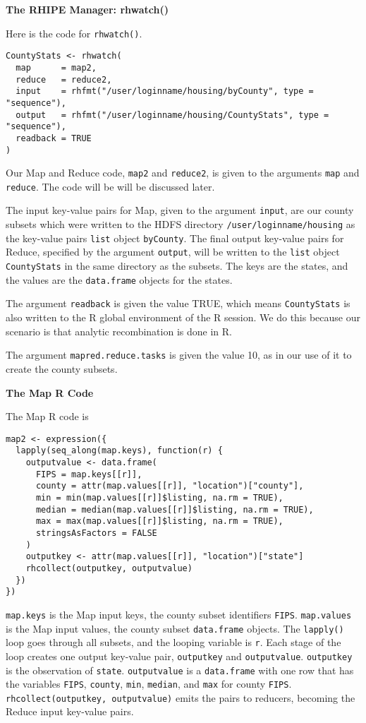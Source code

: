 \textbf{The RHIPE Manager: rhwatch()}

Here is the code for \texttt{rhwatch()}.

\begin{verbatim}
CountyStats <- rhwatch(
  map      = map2,
  reduce   = reduce2,
  input    = rhfmt("/user/loginname/housing/byCounty", type = "sequence"),
  output   = rhfmt("/user/loginname/housing/CountyStats", type = "sequence"),
  readback = TRUE
)
\end{verbatim}

Our Map and Reduce code, \texttt{map2} and \texttt{reduce2}, is given to the arguments
\texttt{map} and \texttt{reduce}. The code will be will be discussed later.

The input key-value pairs for Map, given to the argument \texttt{input},
are our county subsets which were written to the HDFS directory
\texttt{/user/loginname/housing}  as the key-value pairs \texttt{list} object \texttt{byCounty}. 
The final output key-value pairs for Reduce, specified by the argument
\texttt{output}, will be written to the \texttt{list} object \texttt{CountyStats} in the same
directory as the subsets. The keys are the states, and the values are the
\texttt{data.frame} objects for the states.

The argument \texttt{readback} is given the value TRUE, which means \texttt{CountyStats} is
also written to the R global environment of the R session. We do this because
our scenario is that analytic recombination is done in R.

The argument \texttt{mapred.reduce.tasks} is given the value 10, as in our use of it
to create the county subsets.


\textbf{The Map R Code}

The Map R code is
\begin{verbatim}
map2 <- expression({
  lapply(seq_along(map.keys), function(r) {
    outputvalue <- data.frame(
      FIPS = map.keys[[r]],
      county = attr(map.values[[r]], "location")["county"],
      min = min(map.values[[r]]$listing, na.rm = TRUE),
      median = median(map.values[[r]]$listing, na.rm = TRUE),
      max = max(map.values[[r]]$listing, na.rm = TRUE),
      stringsAsFactors = FALSE
    )
    outputkey <- attr(map.values[[r]], "location")["state"]
    rhcollect(outputkey, outputvalue)
  })
})
\end{verbatim}

\texttt{map.keys} is the Map input keys, the county subset identifiers \texttt{FIPS}.
\texttt{map.values} is the Map input values, the county subset \texttt{data.frame}
objects. The \texttt{lapply()} loop goes through all subsets, and the looping
variable is \texttt{r}. Each stage of the loop creates one output key-value pair,
\texttt{outputkey} and \texttt{outputvalue}.
\texttt{outputkey} is the observation of \texttt{state}. \texttt{outputvalue} is a \texttt{data.frame}
with one row that has the variables \texttt{FIPS}, \texttt{county}, \texttt{min}, \texttt{median}, and
\texttt{max} for county \texttt{FIPS}. \texttt{rhcollect(outputkey, outputvalue)} emits the pairs
to reducers, becoming the Reduce input key-value pairs.


